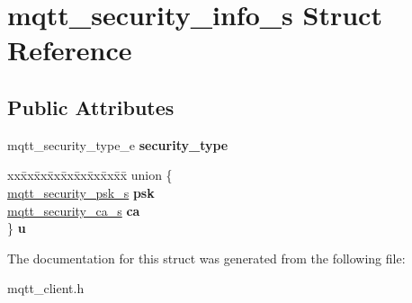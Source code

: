\hypertarget{structmqtt__security__info__s}{}\section{mqtt\+\_\+security\+\_\+info\+\_\+s Struct Reference}
\label{structmqtt__security__info__s}
\subsection*{Public Attributes}
\begin{DoxyCompactItemize}
\item 
\mbox{\label{structmqtt__security__info__s_a798c1c408fb08a3559ee7a24ceb2e96d}} 
mqtt\+\_\+security\+\_\+type\+\_\+e {\bfseries security\+\_\+type}
\item 
\mbox{\label{structmqtt__security__info__s_ae992fd512b321a2a53cd6e59d26b4d31}} 
\begin{tabbing}
xx\=xx\=xx\=xx\=xx\=xx\=xx\=xx\=xx\=\kill
union \{\\
\>\mbox{\hyperlink{structmqtt__security__psk__s}{mqtt\_security\_psk\_s}} {\bfseries psk}\\
\>\mbox{\hyperlink{structmqtt__security__ca__s}{mqtt\_security\_ca\_s}} {\bfseries ca}\\
\} {\bfseries u}\\

\end{tabbing}\end{DoxyCompactItemize}


The documentation for this struct was generated from the following file\+:\begin{DoxyCompactItemize}
\item 
mqtt\+\_\+client.\+h\end{DoxyCompactItemize}
